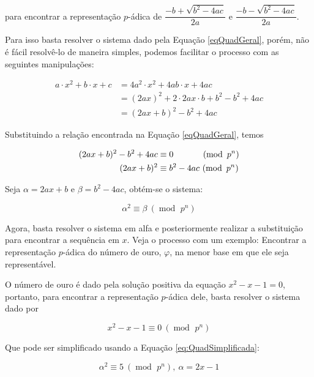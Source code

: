 \documentclass{report}
\DeclareMathOperator{\modulo}{mod \ }
\theoremstyle{definition}
\begin{document}
\smallskip

para encontrar a representação $p$-ádica de $\dfrac{-b + \sqrt{b^2-4ac}}{2a}$ e $\dfrac{-b - \sqrt{b^2-4ac}}{2a}$.

\smallskip

Para isso basta resolver o sistema dado pela Equação \ref{eqQuadGeral}, porém, não é fácil resolvê-lo de maneira simples, podemos facilitar o processo com as seguintes manipulações:

\begin{align*}
    a \cdot x^2 + b \cdot x + c &= 4a^2 \cdot x^2 + 4ab \cdot x + 4ac \\
                                &= (2ax)^2 + 2 \cdot 2ax \cdot b + b^2 - b^2 + 4ac \\
                                &= (2ax+b)^2 - b^2 + 4ac
\end{align*}

Substituindo a relação encontrada na Equação \ref{eqQuadGeral}, temos

\begin{align*}
    (2ax+b)^2 - b^2 + 4ac &\equiv 0\hphantom{^2 - 4ac} \ (\modulo p^n) \\
    (2ax+b)^2             &\equiv b^2 - 4ac \ (\modulo p^n) 
\end{align*}

Seja $\alpha = 2ax+b$ e $\beta = b^2 - 4ac$, obtém-se o sistema:

\begin{equation}\label{eq:QuadSimplificada}
    \alpha^2 \equiv \beta \ (\modulo p^n) 
\end{equation}

Agora, basta resolver o sistema em alfa e posteriormente realizar a substituição para encontrar a sequência em $x$. Veja o processo com um exemplo: Encontrar a representação $p$-ádica do número de ouro, $\varphi$, na menor base em que ele seja representável.

\bigskip

O número de ouro é dado pela solução positiva da equação $x^2 - x - 1 = 0$, portanto, para encontrar a representação $p$-ádica dele, basta resolver o sistema dado por

\begin{equation*}
    x^2 - x - 1 \equiv 0 \ (\modulo p^n)
\end{equation*}

Que pode ser simplificado usando a Equação \ref{eq:QuadSimplificada}:

\begin{equation*}
    \alpha^2 \equiv 5 \ (\modulo p^n), \ \alpha = 2x-1
\end{equation*}
\end{document}

